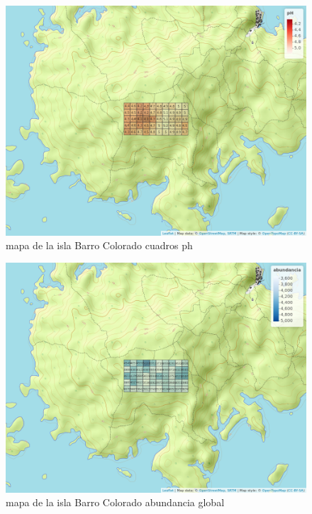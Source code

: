 \documentclass[11pt,]{article}
\begin{document}
\begin{figure}
\centering
\includegraphics[width=1.00000\textwidth]{mapa_cuadros_ph.png}
\caption{mapa de la isla Barro Colorado cuadros ph\label{fig:bci_map}}
\end{figure}

\begin{figure}
\centering
\includegraphics[width=1.00000\textwidth]{mapa_cuadros_abun_global.png}
\caption{mapa de la isla Barro Colorado abundancia global
\label{fig:bci_map}}
\end{figure}
\end{document}
